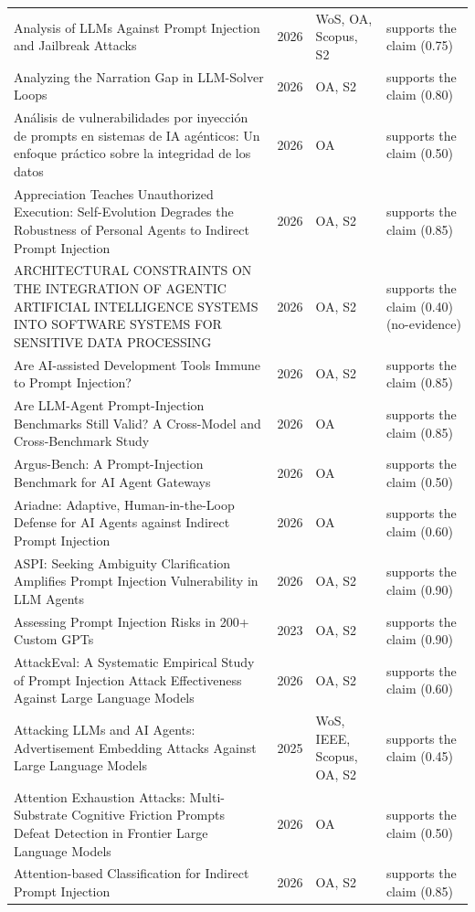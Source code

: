 \begin{longtable}{@{}%
  >{\raggedright\arraybackslash}p{}c%
  >{\raggedright\arraybackslash}p{}%
  >{\raggedright\arraybackslash}p{}@{}}
Analysis of LLMs Against Prompt Injection and Jailbreak Attacks & 2026 & WoS, OA, Scopus, S2 & supports the claim (0.75) \\
Analyzing the Narration Gap in LLM-Solver Loops & 2026 & OA, S2 & supports the claim (0.80) \\
Análisis de vulnerabilidades por inyección de prompts en sistemas de IA agénticos: Un enfoque práctico sobre la integridad de los datos & 2026 & OA & supports the claim (0.50) \\
Appreciation Teaches Unauthorized Execution: Self-Evolution Degrades the Robustness of Personal Agents to Indirect Prompt Injection & 2026 & OA, S2 & supports the claim (0.85) \\
ARCHITECTURAL CONSTRAINTS ON THE INTEGRATION OF AGENTIC ARTIFICIAL INTELLIGENCE SYSTEMS INTO SOFTWARE SYSTEMS FOR SENSITIVE DATA PROCESSING & 2026 & OA, S2 & supports the claim (0.40) (no-evidence) \\
Are AI-assisted Development Tools Immune to Prompt Injection? & 2026 & OA, S2 & supports the claim (0.85) \\
Are LLM-Agent Prompt-Injection Benchmarks Still Valid? A Cross-Model and Cross-Benchmark Study & 2026 & OA & supports the claim (0.85) \\
Argus-Bench: A Prompt-Injection Benchmark for AI Agent Gateways & 2026 & OA & supports the claim (0.50) \\
Ariadne: Adaptive, Human-in-the-Loop Defense for AI Agents against Indirect Prompt Injection & 2026 & OA & supports the claim (0.60) \\
ASPI: Seeking Ambiguity Clarification Amplifies Prompt Injection Vulnerability in LLM Agents & 2026 & OA, S2 & supports the claim (0.90) \\
Assessing Prompt Injection Risks in 200+ Custom GPTs & 2023 & OA, S2 & supports the claim (0.90) \\
AttackEval: A Systematic Empirical Study of Prompt Injection Attack Effectiveness Against Large Language Models & 2026 & OA, S2 & supports the claim (0.60) \\
Attacking LLMs and AI Agents: Advertisement Embedding Attacks Against Large Language Models & 2025 & WoS, IEEE, Scopus, OA, S2 & supports the claim (0.45) \\
Attention Exhaustion Attacks: Multi-Substrate Cognitive Friction Prompts Defeat Detection in Frontier Large Language Models & 2026 & OA & supports the claim (0.50) \\
Attention-based Classification for Indirect Prompt Injection & 2026 & OA, S2 & supports the claim (0.85) \\

\end{longtable}
